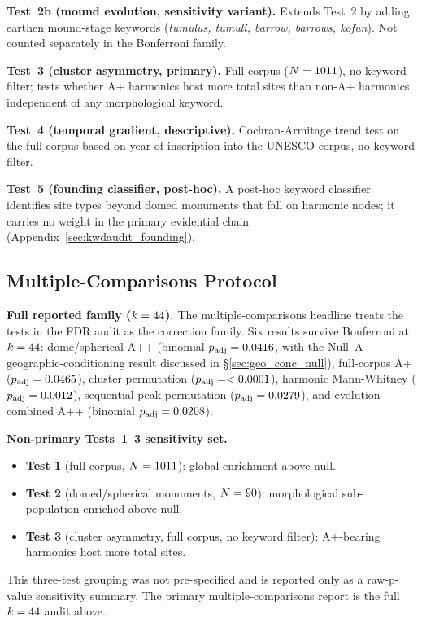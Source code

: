 \textbf{Test~2b (mound evolution, sensitivity variant).}
Extends Test~2 by adding earthen mound-stage keywords
(\textit{tumulus, tumuli, barrow, barrows, kofun}).
Not counted separately in the Bonferroni family.

\textbf{Test~3 (cluster asymmetry, primary).}
Full corpus ($N = 1011$), no keyword filter; tests whether
A+ harmonics host more total sites than non-A+ harmonics, independent
of any morphological keyword.

\textbf{Test~4 (temporal gradient, descriptive).}
Cochran-Armitage trend test on the full corpus based on year of
inscription into the UNESCO corpus, no keyword filter.

\textbf{Test~5 (founding classifier, post-hoc).}
A post-hoc keyword classifier identifies site types beyond domed monuments that fall on harmonic nodes; it carries no weight in the primary evidential chain (Appendix~\ref{sec:kwdaudit_founding}).

\subsection{Multiple-Comparisons Protocol}
\label{sec:bonferroni}

\textbf{Full reported family ($k = 44$).}
The multiple-comparisons headline treats the \NtotalTests{} tests in the
FDR audit as the correction family. Six results survive Bonferroni at
$k = 44$: dome/spherical A++ (binomial
$p_\mathrm{adj} = 0.0416$, with the Null~A
geographic-conditioning result discussed in \S\ref{sec:geo_conc_null}), full-corpus A+
($p_\mathrm{adj} = 0.0465$), cluster permutation
($p_\mathrm{adj} = < 0.0001$), harmonic
Mann-Whitney ($p_\mathrm{adj} = 0.0012$),
sequential-peak permutation ($p_\mathrm{adj} = 0.0279$),
and evolution combined A++ (binomial
$p_\mathrm{adj} = 0.0208$).

\textbf{Non-primary Tests~1--3 sensitivity set.}
\begin{itemize}
  \item \textbf{Test 1} (full corpus, $N = 1011$):
    global enrichment above \NullRateAp{} null.
  \item \textbf{Test 2} (domed/spherical monuments, $N = 90$):
    morphological sub-population enriched above \NullRateAp{} null.
  \item \textbf{Test 3} (cluster asymmetry, full corpus, no keyword filter):
    A+-bearing harmonics host more total sites.
\end{itemize}
This three-test grouping was not pre-specified and is reported only as
a raw-p-value sensitivity summary. The primary multiple-comparisons
report is the full $k = 44$ audit above.

